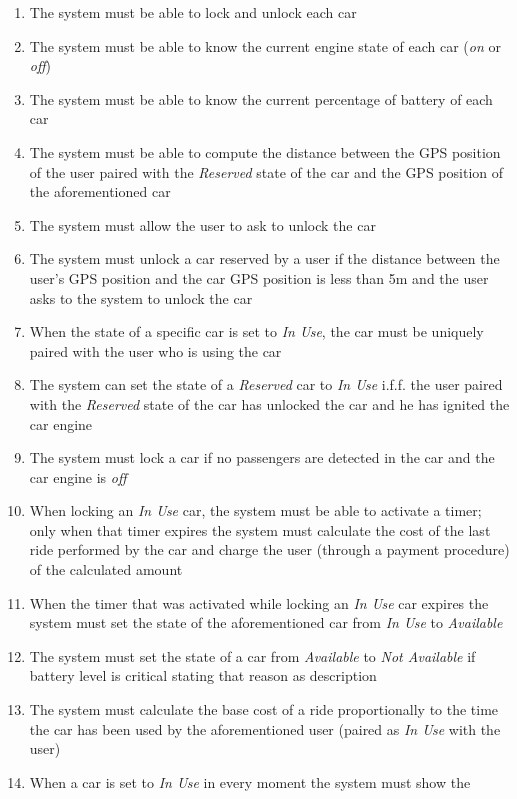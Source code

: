 \begin{description}
\begin{enumerate}[resume*]
  				\item The system must be able to lock and unlock each car
  				\item The system must be able to know the current engine state of each car
  				(\emph{on} or \emph{off})
  				\item The system must be able to know the current percentage of battery of each car
  				\item The system must be able to compute the distance between the GPS position of
  				the user paired	with the \emph{Reserved} state of the car and the GPS position of the
  				aforementioned car
  				\item The system must allow the user to ask to unlock the car
  				\item The system must unlock a car reserved by a user if the distance between the user's GPS position and the car GPS position is less than 5m and the user asks to the system to unlock the car
  				\item When the state of a specific car is set to \emph{In Use}, the car must be
 	  			uniquely paired with the user who is using the car
  				\item The system can set the state of a \emph{Reserved} car to \emph{In Use} i.f.f.
  				the user paired with the \emph{Reserved} state of the car has unlocked the car and he
  				has ignited the car engine
  				\item The system must lock a car if no passengers are detected in the car and the car
  				engine is \emph{off}
  				\item When locking  an \emph{In Use} car, the system must be able to activate a timer;
  				only when that timer expires the system must calculate the cost of the last ride
  				performed by the car and charge the user (through a payment procedure) of the calculated
  				amount
  				\item When the timer that was activated while locking an \emph{In Use} car expires the system must
  				set the state of the aforementioned car from \emph{In Use} to \emph{Available}
  				\item The system must set the state of a car from \emph{Available}
  				to \emph{Not Available} if battery level is critical  stating that reason
  				as description
  				\item The system must calculate the base cost of a ride proportionally to the time
  				the car has been used by the aforementioned user (paired as \emph{In Use} with the
  				user)
  				\item When a car is set to \emph{In Use} in every moment the system must show the

\end{enumerate}
\end{description}
